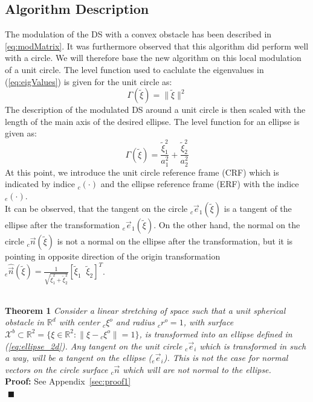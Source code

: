 \subsection{Algorithm Description}
The modulation of the DS with a convex obstacle has been described in \ref{eq:modMatrix}. It was furthermore observed that this algorithm did perform well with a circle. We will therefore base the new algorithm on this local modulation of a unit circle. The level function used to caclulate the eigenvalues in (\ref{eq:eigValues}) is given for the unit circle as:
\begin{equation}
\Gamma(\tilde \xi) = \| \tilde \xi \|^2 \label{eq:levelCircle}
\end{equation}
The description of the modulated DS around a unit circle is then scaled with the length of the main axis of the desired ellipse. The level function for an ellipse is given as:
\begin{equation}
\Gamma(\tilde \xi) = \frac{\tilde \xi_1^2}{a_1^2} +  \frac{\tilde \xi_2^2}{a_2^2} \label{eq:levelEllipse}
\end{equation}At this point, we introduce the unit circle reference frame (CRF) which is indicated by indice ${}_c (\cdot)$ and the ellipse reference frame (ERF) with the indice ${}_e(\cdot)$. \\
It can be observed, that the tangent on the circle ${}_c \vec e_1(\tilde \xi)$ is a tangent of the ellipse after the transformation ${}_e \vec e_1(\tilde \xi)$. On the other hand, the normal on the circle ${}_c \vec n (\tilde \xi)$ is not a normal on the ellipse after the transformation, but it is pointing in opposite direction of the origin transformation ${}_e \hat{\vec n} (\tilde \xi) = \frac{1}{\sqrt{\tilde \xi_1^2 + \tilde \xi_2^2}} [\tilde \xi_1 \;\; \tilde \xi_2]^T $.

\\ \noindent \textbf{Theorem 1}
\textit{Consider a linear stretching of space such that a unit spherical obstacle in $\mathbb{R}^d$ with center ${}_c \xi^o$ and radius ${}_cr^o = 1$, with surface $\mathcal{X}^b \subset \mathbb{R}^2  = \{ \xi \in \mathbb{R}^2: \| \xi - {}_c\xi^o \| = 1\}$, is transformed into an ellipse defined in (\ref{eq:ellipse_2d}). Any tangent  on the unit circle ${}_c \vec{e}_i$ which is transformed in such a way, will be a tangent on the ellipse (${}_e \vec{e}_i$). This is not the case for normal vectors on the circle surface ${}_c \vec{n}$ which will are not normal to the ellipse.}\\
\textbf{Proof:} See Appendix~\ref{sec:proof1} \\
${}$ \hfill $\blacksquare$\\

